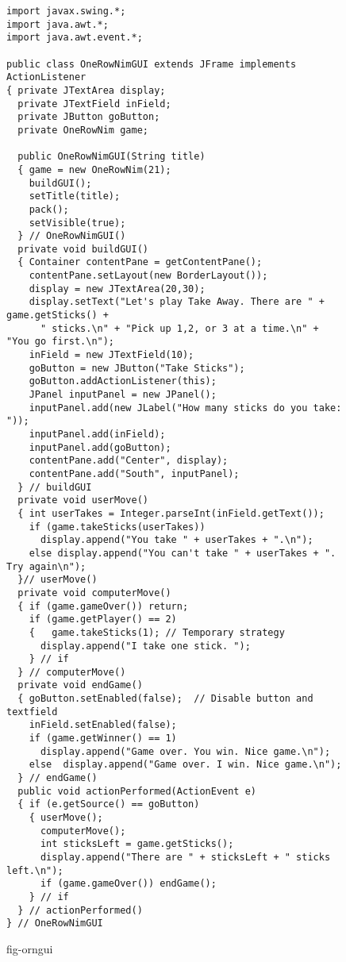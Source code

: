 \begin{figure}[p]
\jjjprogstart
\begin{jjjlisting}
\begin{lstlisting}[basicstyle=\scriptsize]
import javax.swing.*;
import java.awt.*;
import java.awt.event.*;

public class OneRowNimGUI extends JFrame implements ActionListener
{ private JTextArea display;
  private JTextField inField;
  private JButton goButton;
  private OneRowNim game;
	    
  public OneRowNimGUI(String title) 
  { game = new OneRowNim(21);  
    buildGUI();
    setTitle(title);
    pack();
    setVisible(true);
  } // OneRowNimGUI()
  private void buildGUI() 
  { Container contentPane = getContentPane();
    contentPane.setLayout(new BorderLayout());
    display = new JTextArea(20,30);
    display.setText("Let's play Take Away. There are " + game.getSticks() + 
      " sticks.\n" + "Pick up 1,2, or 3 at a time.\n" + "You go first.\n");
    inField = new JTextField(10);
    goButton = new JButton("Take Sticks");
    goButton.addActionListener(this);
    JPanel inputPanel = new JPanel();
    inputPanel.add(new JLabel("How many sticks do you take: "));
    inputPanel.add(inField);
    inputPanel.add(goButton);
    contentPane.add("Center", display);
    contentPane.add("South", inputPanel);
  } // buildGUI
  private void userMove()
  { int userTakes = Integer.parseInt(inField.getText());
    if (game.takeSticks(userTakes)) 
      display.append("You take " + userTakes + ".\n");
    else display.append("You can't take " + userTakes + ". Try again\n");
  }// userMove()
  private void computerMove() 
  { if (game.gameOver()) return;
    if (game.getPlayer() == 2) 
    {   game.takeSticks(1); // Temporary strategy
      display.append("I take one stick. ");
    } // if
  } // computerMove()
  private void endGame()
  { goButton.setEnabled(false);  // Disable button and textfield
    inField.setEnabled(false);
    if (game.getWinner() == 1)
      display.append("Game over. You win. Nice game.\n");
    else  display.append("Game over. I win. Nice game.\n");
  } // endGame()
  public void actionPerformed(ActionEvent e) 
  { if (e.getSource() == goButton) 
    { userMove();
      computerMove();
      int sticksLeft = game.getSticks();
      display.append("There are " + sticksLeft + " sticks left.\n");
      if (game.gameOver()) endGame();
    } // if
  } // actionPerformed()
} // OneRowNimGUI
\end{lstlisting}
\end{jjjlisting}
{fig-orngui}
\end{figure}

